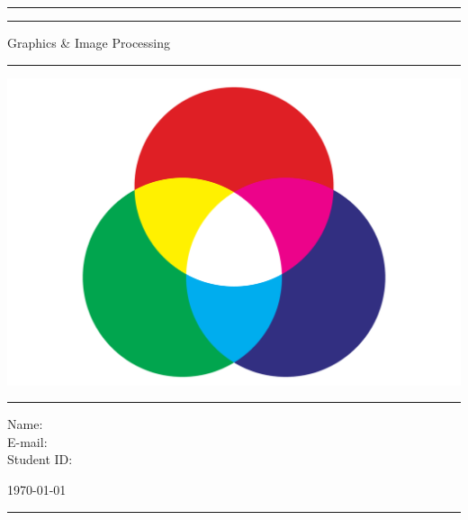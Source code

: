 \documentclass[a4paper,11pt]{article}
\author{Andrew Hayes}
\begin{document}
\begin{titlepage}
    \begin{center}
        \hrule
        \vspace*{0.6cm}
        \vspace*{0.6cm}
        \hrule
        \LARGE
        \vspace{0.5cm}
            Graphics \& Image Processing
        \vspace{0.5cm}
        \hrule

        \vfill
            \centering
            \includegraphics[width=\textwidth]{images/cover.png}
        \vfill

        \hrule
        \begin{minipage}{0.495\textwidth} 
            \vspace{0.4em}
            \raggedright
            \normalsize 
            Name:  \\
            E-mail:   \hfill\\   
            Student ID:  \hfill
        \end{minipage}
        \begin{minipage}{0.495\textwidth} 
            \raggedleft
            \vspace*{0.8cm}
            \Large
            \today
            \vspace*{0.6cm}
        \end{minipage}
        \medskip\hrule 
    \end{center}
\end{titlepage}
\end{document}
